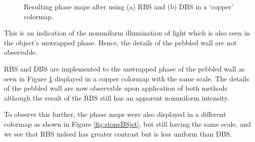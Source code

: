 \captionsetup[figure]{width=5in}
\begin{figure}[h!t]
	\centering
	\caption[Phase maps after RBS and DBS (copper colormap)]{Resulting phase maps after using (a) RBS and (b) DBS in a `copper' colormap.}
	\label{fig:stoneBS}
\end{figure}

This is an indication of the nonuniform illumination of light which is also seen in the object's unwrapped phase. 
Hence, the details of the pebbled wall are not observable.

RBS and DBS are implemented to the unwrapped phase of the pebbled wall as seen in Figure \ref{fig:stoneBS} displayed in a copper colormap with the same scale. 
The details of the pebbled wall are now observable upon application of both methods although the result of the RBS still has an apparent nonuniform intensity.

To observe this further, the phase maps were also displayed in a different colormap as shown in Figure  \ref{fig:stoneBSjet}, but still having the same scale, and we see that RBS indeed has greater contrast but is less uniform than DBS. 

